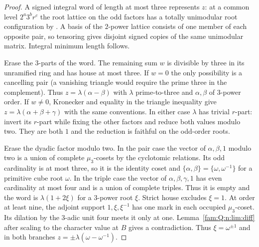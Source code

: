 \documentclass[11pt,a4paper]{article}
\numberwithin{equation}{section}
\theoremstyle{remark}
\begin{document}
\begin{proof}
A signed integral word of length at most three represents $z$:
at a common level $2^a3^br^c$ the root lattice on the odd factors
has a totally unimodular root configuration by \cite[Theorems~3 and~13]{BH}.
A basis of the $2$-power lattice consists of one member of each
opposite pair, so tensoring gives disjoint signed copies of the
same unimodular matrix. Integral minimum length follows.

Erase the $3$-parts of the word. The remaining sum $w$ is divisible
by three in its unramified ring and has house at most three.
If $w=0$ the only possibility is a cancelling pair (a vanishing
triangle would require the prime three in the complement).
Thus $z=\lambda(\alpha-\beta)$ with $\lambda$ prime-to-three
and $\alpha,\beta$ of $3$-power order. If $w\ne0$, Kronecker and
equality in the triangle inequality give
$z=\lambda(\alpha+\beta+\gamma)$ with the same conventions.
In either case $\lambda$ has trivial $r$-part: invert its
$r$-part while fixing the other factors and reduce both values
modulo two. They are both $1$ and the reduction is faithful on
the odd-order roots.

Erase the dyadic factor modulo two. In the pair case the vector
of $\alpha,\beta,1$ modulo two is a union of complete
$\mu_3$-cosets by the cyclotomic relations. Its odd cardinality
is at most three, so it is the identity coset and
$\{\alpha,\beta\}=\{\omega,\omega^{-1}\}$ for a primitive
cube root $\omega$. In the triple case the vector of
$\alpha,\beta,\gamma,1$ has even cardinality at most four
and is a union of complete triples. Thus it is empty and the
word is $\lambda(1+2\xi)$ for a $3$-power root $\xi$.
Strict house excludes $\xi=1$. At order at least nine, the adjoint
support $1,\xi,\xi^{-1}$ has one mark in each occupied
$\mu_3$-coset. Its dilation by the $3$-adic unit four meets it
only at one. Lemma~\ref{fam:Q:n:lim:diff} after scaling to the character value at $B$ gives a contradiction. Thus $\xi=\omega^{\pm1}$ and in both branches
$z=\pm\lambda(\omega-\omega^{-1})$.
\end{proof}
\end{document}
